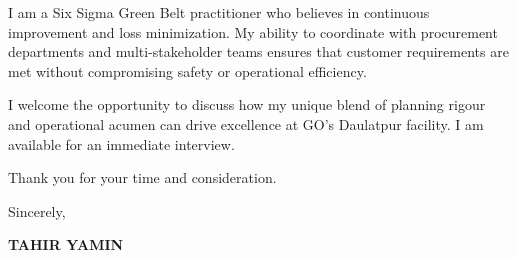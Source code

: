 \documentclass[11pt,a4paper]{article}
\begin{document}
I am a Six Sigma Green Belt practitioner who believes in continuous improvement and loss minimization. My ability to coordinate with procurement departments and multi-stakeholder teams ensures that customer requirements are met without compromising safety or operational efficiency.

I welcome the opportunity to discuss how my unique blend of planning rigour and operational acumen can drive excellence at GO's Daulatpur facility. I am available for an immediate interview.

Thank you for your time and consideration.

\vspace{0.5cm}
Sincerely,

\vspace{0.5cm}
\textbf{TAHIR YAMIN}
\end{document}
